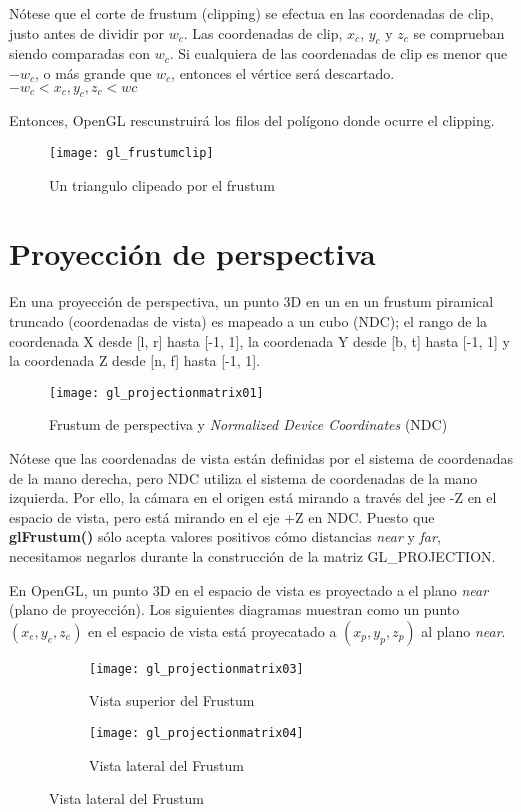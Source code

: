 Nótese que el corte de frustum (clipping) se efectua en las coordenadas de clip, justo antes de dividir por $w_c$. Las coordenadas de clip, $x_c$, $y_c$ y $z_c$ se comprueban siendo comparadas con $w_c$. Si cualquiera de las coordenadas de clip es menor que $-w_c$, o más grande que $w_c$, entonces el vértice será descartado.
$ -w_c < x_c, y_c, z_c < wc $

Entonces, OpenGL rescunstruirá los filos del polígono donde ocurre el clipping.

\begin{figure} [h]
  \centering
  \texttt{[image: gl\_frustumclip]}
  \caption{Un triangulo clipeado por el frustum}
\end{figure}

\section{Proyección de perspectiva}
En una proyección de perspectiva, un punto 3D en un en un frustum piramical truncado (coordenadas de vista) es mapeado a un cubo (NDC); el rango de la coordenada X desde [l, r] hasta [-1, 1], la coordenada Y desde [b, t] hasta [-1, 1] y la coordenada Z desde [n, f] hasta [-1, 1].

\begin{figure} [h]
  \centering
  \texttt{[image: gl\_projectionmatrix01]}
  \caption{Frustum de perspectiva y \textit{Normalized Device Coordinates} (NDC)}
\end{figure}


\newpage

Nótese que las coordenadas de vista están definidas por el sistema de coordenadas de la mano derecha, pero NDC utiliza el sistema de coordenadas de la mano izquierda. Por ello, la cámara en el origen está mirando a través del jee -Z en el espacio de vista, pero está mirando en el eje +Z en NDC. Puesto que \textbf{glFrustum()} sólo acepta valores positivos cómo distancias \textit{near} y \textit{far}, necesitamos negarlos durante la construcción de la matriz GL\_PROJECTION.

En OpenGL, un punto 3D en el espacio de vista es proyectado a el plano \textit{near} (plano de proyección). Los siguientes diagramas muestran como un punto $(x_e, y_e, z_e)$ en el espacio de vista está proyecatado a $(x_p, y_p, z_p)$ al plano \textit{near}.

\begin{figure} [h]
  \centering
  \captionsetup[subfigure]{justification=centering}
  \begin{subfigure}{0.3\textwidth} 
    \texttt{[image: gl\_projectionmatrix03]} 
    \caption{Vista superior del Frustum}
  \end{subfigure}
  \begin{subfigure}{0.3\textwidth}
    \texttt{[image: gl\_projectionmatrix04]} 
    \caption{Vista lateral del Frustum}
  \end{subfigure}
\end{figure}

